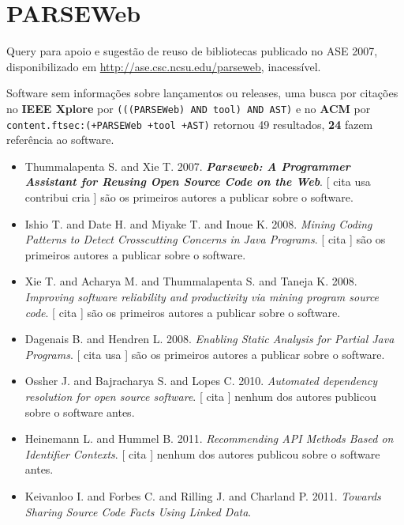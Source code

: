 \section{PARSEWeb}

Query para apoio e sugestão de reuso de bibliotecas
publicado no ASE 2007,
disponibilizado em \url{http://ase.csc.ncsu.edu/parseweb},
inacessível.

Software sem informações sobre lançamentos ou releases,
uma busca por citações no {\bf IEEE Xplore} por
\texttt{(((PARSEWeb) AND tool) AND AST)}
e no {\bf ACM} por
\texttt{content.ftsec:(+PARSEWeb +tool +AST)}
retornou
49 resultados,
{\bf 24} fazem referência ao software.

\begin{itemize}
\item Thummalapenta S. and Xie T.
      2007.
        \textbf{\textit{ Parseweb: A Programmer Assistant for Reusing Open Source Code on the Web}}.
      [
          cita
          usa
          contribui
          cria
      ]
são os primeiros autores a publicar sobre o software.
\item Ishio T. and Date H. and Miyake T. and Inoue K.
      2008.
        \textit{ Mining Coding Patterns to Detect Crosscutting Concerns in Java Programs}.
      [
          cita
      ]
são os primeiros autores a publicar sobre o software.
\item Xie T. and Acharya M. and Thummalapenta S. and Taneja K.
      2008.
        \textit{ Improving software reliability and productivity via mining program source code}.
      [
          cita
      ]
são os primeiros autores a publicar sobre o software.
\item Dagenais B. and Hendren L.
      2008.
        \textit{ Enabling Static Analysis for Partial Java Programs}.
      [
          cita
          usa
      ]
são os primeiros autores a publicar sobre o software.
\item Ossher J. and Bajracharya S. and Lopes C.
      2010.
        \textit{ Automated dependency resolution for open source software}.
      [
          cita
      ]
nenhum dos autores publicou sobre o software antes.
\item Heinemann L. and Hummel B.
      2011.
        \textit{ Recommending API Methods Based on Identifier Contexts}.
      [
          cita
      ]
nenhum dos autores publicou sobre o software antes.
\item Keivanloo I. and Forbes C. and Rilling J. and Charland P.
      2011.
        \textit{ Towards Sharing Source Code Facts Using Linked Data}.

\end{itemize}
